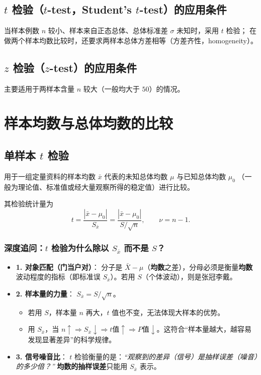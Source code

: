 \documentclass[lang=cn,10pt]{elegantbook}
\begin{document}
\subsection{$t$ 检验（$t$-test，Student's $t$-test）的应用条件}
当样本例数 $n$ 较小、样本来自正态总体、总体标准差 $\sigma$ 未知时，采用 $t$ 检验；
在做两个样本均数比较时，还要求两样本总体方差相等（方差齐性，homogeneity）。

\subsection{$z$ 检验（$z$-test）的应用条件}
主要适用于两样本含量 $n$ 较大（一般均大于 $50$）的情况。

\section{样本均数与总体均数的比较}

\subsection{单样本 $t$ 检验}
用于一组定量资料的样本均数 $\bar{x}$ 代表的未知总体均数 $\mu$ 与已知总体均数 $\mu_0$
（一般为理论值、标准值或经大量观察所得的稳定值）进行比较。

其检验统计量为
\begin{equation}
  t = \frac{\left|\bar{x}-\mu_0\right|}{S_{\bar{x}}} = \frac{\left|\bar{x}-\mu_0\right|}{S/\sqrt{n}}, \qquad \nu = n-1.
\end{equation}

\subsubsection{深度追问：$t$ 检验为什么除以 $S_{\bar{x}}$ 而不是 $S$？}

\begin{itemize}
    \item \textbf{1. 对象匹配（门当户对）}：
    分子是 $\bar{X} - \mu$（\textbf{均数}之差），分母必须是衡量\textbf{均数}波动程度的指标（即标准误 $S_{\bar{x}}$）。若用 $S$（个体波动），则是张冠李戴。
    
    \item \textbf{2. 样本量的力量}：
    $S_{\bar{x}} = S / \sqrt{n}$。
    \begin{itemize}
        \item 若用 $S$，样本量 $n$ 再大，$t$ 值也不变，无法体现大样本的优势。
        \item 用 $S_{\bar{x}}$，当 $n \uparrow \Rightarrow S_{\bar{x}} \downarrow \Rightarrow t \text{值} \uparrow \Rightarrow P \text{值} \downarrow$。这符合“样本量越大，越容易发现显著差异”的科学规律。
    \end{itemize}
    
    \item \textbf{3. 信号噪音比}：
    $t$ 检验衡量的是：\textit{“观察到的差异（信号）是抽样误差（噪音）的多少倍？”}
    \textbf{均数的抽样误差}只能用 $S_{\bar{x}}$ 表示。
\end{itemize}
\end{document}
